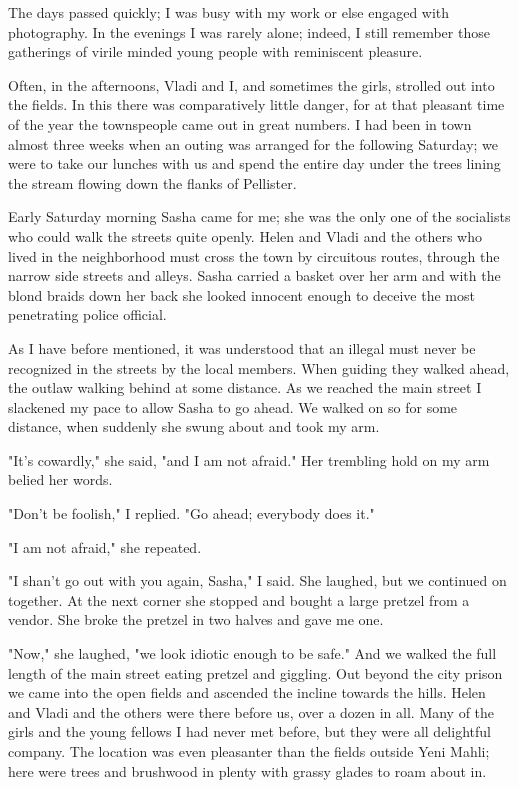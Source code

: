 \documentclass[a5paper,12pt]{book}
\begin{document}
The days passed quickly; I was busy with my work or else engaged with photography. In the evenings I was rarely alone; indeed, I still remember those gatherings of virile minded young people with reminiscent pleasure.

Often, in the afternoons, Vladi and I, and sometimes the girls, strolled out into the fields. In this there was comparatively little danger, for at that pleasant time of the year the townspeople came out in great numbers. I had been in town almost three weeks when an outing was arranged for the following Saturday; we were to take our lunches with us and spend the entire day under the trees lining the stream flowing down the flanks of Pellister.

Early Saturday morning Sasha came for me; she was the only one of the socialists who could walk the streets quite openly. Helen and Vladi and the others who lived in the neighborhood must cross the town by circuitous routes, through the narrow side streets and alleys. Sasha carried a basket over her arm and with the blond braids down her back she looked innocent enough to deceive the most penetrating police official.

As I have before mentioned, it was understood that an illegal must never be recognized in the streets by the local members. When guiding they walked ahead, the outlaw walking behind at some distance. As we reached the main street I slackened my pace to allow Sasha to go ahead. We walked on so for some distance, when suddenly she swung about and took my arm.

"It’s cowardly," she said, "and I am not afraid." Her trembling hold on my arm belied her words.

"Don’t be foolish," I replied. "Go ahead; everybody does it."

"I am not afraid," she repeated.

"I shan’t go out with you again, Sasha," I said. She laughed, but we continued on together. At the next corner she stopped and bought a large pretzel from a vendor. She broke the pretzel in two halves and gave me one.

"Now," she laughed, "we look idiotic enough to be safe." And we walked the full length of the main street eating pretzel and giggling.
Out beyond the city prison we came into the open fields and ascended the incline towards the hills. Helen and Vladi and the others were there before us, over a dozen in all. Many of the girls and the young fellows I had never met before, but they were all delightful company. The location was even pleasanter than the fields outside Yeni Mahli; here were trees and brushwood in plenty with grassy glades to roam about in.
\end{document}
